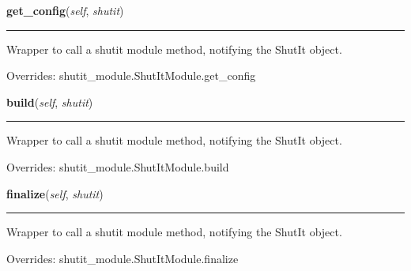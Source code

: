     \vspace{0.5ex}

\hspace{.8\funcindent}\begin{boxedminipage}{\funcwidth}

    \raggedright \textbf{get\_config}(\textit{self}, \textit{shutit})

    \vspace{-1.5ex}

    \rule{\textwidth}{0.5\fboxrule}
\setlength{\parskip}{2ex}
    Wrapper to call a shutit module method, notifying the ShutIt object.

\setlength{\parskip}{1ex}
      Overrides: shutit\_module.ShutItModule.get\_config

    \end{boxedminipage}

    \vspace{0.5ex}

\hspace{.8\funcindent}\begin{boxedminipage}{\funcwidth}

    \raggedright \textbf{build}(\textit{self}, \textit{shutit})

    \vspace{-1.5ex}

    \rule{\textwidth}{0.5\fboxrule}
\setlength{\parskip}{2ex}
    Wrapper to call a shutit module method, notifying the ShutIt object.

\setlength{\parskip}{1ex}
      Overrides: shutit\_module.ShutItModule.build

    \end{boxedminipage}

    \vspace{0.5ex}

\hspace{.8\funcindent}\begin{boxedminipage}{\funcwidth}

    \raggedright \textbf{finalize}(\textit{self}, \textit{shutit})

    \vspace{-1.5ex}

    \rule{\textwidth}{0.5\fboxrule}
\setlength{\parskip}{2ex}
    Wrapper to call a shutit module method, notifying the ShutIt object.

\setlength{\parskip}{1ex}
      Overrides: shutit\_module.ShutItModule.finalize

    \end{boxedminipage}


